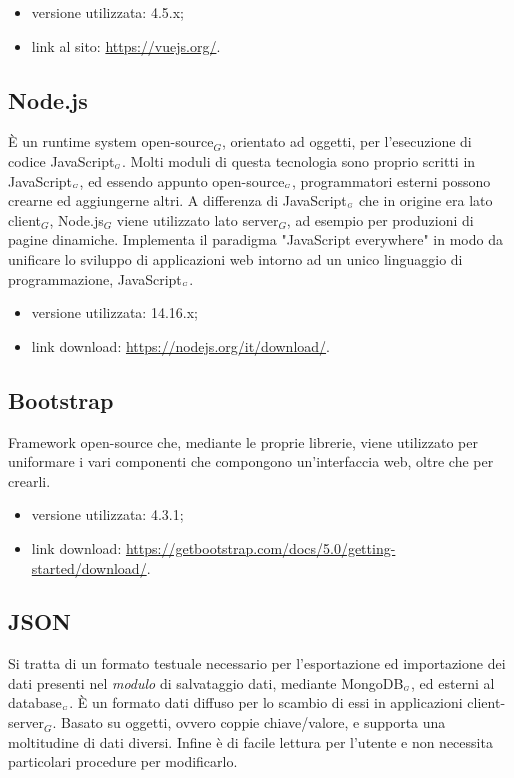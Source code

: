 \begin{itemize}
  \item versione utilizzata: 4.5.x;
  \item link al sito: \url{https://vuejs.org/}.
\end{itemize}

\subsection{Node.js}\label{TecnologieNode}
È un runtime system open-source$_G$, orientato ad oggetti, per l'esecuzione di codice JavaScript$_{\scaleto{G}{3pt}}$.
Molti moduli di questa tecnologia sono proprio scritti in JavaScript$_{\scaleto{G}{3pt}}$, ed essendo appunto open-source$_{\scaleto{G}{3pt}}$, programmatori esterni possono crearne ed aggiungerne altri.
A differenza di JavaScript$_{\scaleto{G}{3pt}}$ che in origine era lato client$_G$, Node.js$_G$ viene utilizzato lato server$_G$, ad esempio per produzioni di pagine dinamiche.
Implementa il paradigma "JavaScript everywhere" in modo da unificare lo sviluppo di applicazioni web intorno ad un unico linguaggio di programmazione, JavaScript$_{\scaleto{G}{3pt}}$.

\begin{itemize}
  \item versione utilizzata: 14.16.x;
  \item link download: \url{https://nodejs.org/it/download/}.
\end{itemize}

\subsection{Bootstrap}\label{TecnologieBootstrap}
Framework open-source che, mediante le proprie librerie, viene utilizzato per uniformare i vari componenti che compongono un'interfaccia web, oltre che per crearli.

\begin{itemize}
  \item versione utilizzata: 4.3.1;
  \item link download: \url{https://getbootstrap.com/docs/5.0/getting-started/download/}.
\end{itemize}


\subsection{JSON}\label{TecnologieJson}
Si tratta di un formato testuale necessario per l'esportazione ed importazione dei dati presenti nel \textit{modulo} di salvataggio dati, mediante MongoDB$_{\scaleto{G}{3pt}}$, ed esterni al database$_{\scaleto{G}{3pt}}$.
È un formato dati diffuso per lo scambio di essi in applicazioni client-server$_G$.
Basato su oggetti, ovvero coppie chiave/valore, e supporta una moltitudine di dati diversi. Infine è di facile lettura per l'utente e non necessita particolari procedure per modificarlo.


